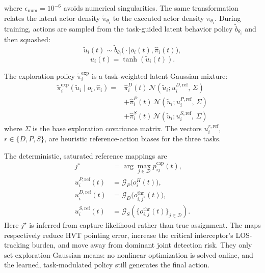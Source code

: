 \documentclass[unbranded]{cja}
\begin{document}
where $\epsilon_{\mathrm{num}}=10^{-6}$ avoids numerical singularities. The same transformation relates the latent actor density $\widetilde\pi_{\theta_i}$ to the executed actor density $\pi_{\theta_i}$. During training, actions are sampled from the task-guided latent behavior policy $\widetilde b_{\theta_i}$ and then squashed:
\begin{equation}
\widetilde u_i(t)
\sim
\widetilde b_{\theta_i}
\bigl(\cdot\mid\bar o_i(t),\hat{\pi}_i(t)\bigr),
\end{equation}
\begin{equation}
u_i(t)
=
\tanh\!\left(\widetilde u_i(t)\right).
\end{equation}

The exploration policy $\widetilde\pi_i^{\mathrm{exp}}$ is a task-weighted latent Gaussian mixture:
\begin{equation}
\begin{aligned}
\widetilde\pi_i^{\mathrm{exp}}(\widetilde u_i\mid o_i,\hat{\pi}_i)
={}&
\hat{\pi}_i^D(t)\,\mathcal{N}\!\left(\widetilde u_i;u_i^{D,\mathrm{ref}},\,\Sigma\right)\\
&+
\hat{\pi}_i^P(t)\,\mathcal{N}\!\left(\widetilde u_i;u_i^{P,\mathrm{ref}},\,\Sigma\right)\\
&+
\hat{\pi}_i^S(t)\,\mathcal{N}\!\left(\widetilde u_i;u_i^{S,\mathrm{ref}},\,\Sigma\right)
\end{aligned}
\end{equation}
where $\Sigma$ is the base exploration covariance matrix. The vectors $u_i^{r,\mathrm{ref}}$, $r\in\{D,P,S\}$, are heuristic reference-action biases for the three tasks.

The deterministic, saturated reference mappings are
\begin{equation}
\begin{aligned}
j^\star
&=\arg\max_{j\in\mathcal D}p_{ij}^{\mathrm{cap}}(t),\\
u_i^{P,\mathrm{ref}}(t)
&=\mathcal G_P\bigl(o_i^H(t)\bigr),\\
u_i^{D,\mathrm{ref}}(t)
&=\mathcal G_D\bigl(o_{i,j^\star}^{\mathrm{thr}}(t)\bigr),\\
u_i^{S,\mathrm{ref}}(t)
&=\mathcal G_S\!\left(\{o_{i,j}^{\mathrm{thr}}(t)\}_{j\in\mathcal D}\right).
\end{aligned}
\end{equation}
Here $j^\star$ is inferred from capture likelihood rather than true assignment. The maps respectively reduce HVT pointing error, increase the critical interceptor's LOS-tracking burden, and move away from dominant joint detection risk. They only set exploration-Gaussian means: no nonlinear optimization is solved online, and the learned, task-modulated policy still generates the final action.
\end{document}
